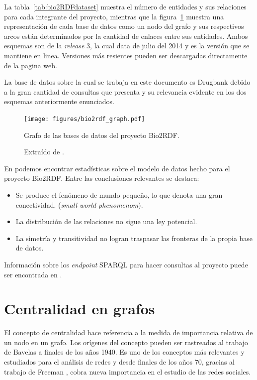 La tabla~\ref{tab:bio2RDFdataset} muestra el número de entidades y sus
relaciones para cada integrante del proyecto, mientras que la
figura~\ref{fig:bio2rdfgraph} muestra una representación de cada
base de datos como un nodo del grafo y sus respectivos arcos están determinados
por la cantidad de enlaces entre sus entidades.
Ambos esquemas son de la \emph{release} 3, la cual data de julio del 2014 y es
la versión que se mantiene en linea.
Versiones más resientes pueden ser descargadas directamente de la pagina web.

La base de datos sobre la cual se trabaja en este documento es Drugbank debido a
la gran cantidad de consultas que presenta y su relevancia evidente en los dos
esquemas anteriormente enunciados.



\begin{figure}[htpb]
  \centering
  \texttt{[image: figures/bio2rdf\_graph.pdf]}
  \caption{Grafo de las bases de datos del proyecto Bio2RDF.}
  \vspace{-.3cm}
  \caption*{Extraído de \cite{hu2015link}.}
  \label{fig:bio2rdfgraph}
\end{figure}

En \cite{hu2015link} podemos encontrar estadísticas sobre el modelo de datos
hecho para el proyecto Bio2RDF. Entre las conclusiones relevantes se destaca:
\begin{itemize}
  \item
    Se produce el fenómeno de mundo pequeño, lo que denota una gran
    conectividad. (\emph{small world phenomenom}).
  \item
    La distribución de las relaciones no sigue una ley potencial.
  \item
    La simetría y transitividad no logran traspasar las fronteras de la propia
    base de datos.
\end{itemize}

Información sobre los \emph{endpoint} SPARQL para hacer consultas al proyecto
puede ser encontrada en \cite{callahan2013bio2rdf}.


\section{Centralidad en grafos}\label{ea:cent}
El concepto de centralidad hace referencia a la medida de importancia relativa
de un nodo en un grafo.
Los orígenes del concepto pueden ser rastreados al trabajo de Bavelas a finales
de los años 1940\cite{bavelas1948mathematical}.
Es uno de los conceptos más relevantes y estudiados para el análisis de redes y
desde finales de los años 70, gracias al trabajo de Freeman 
\etal\cite{freeman1979centrality,freeman1991centrality}, 
cobra nueva importancia en el estudio de las redes sociales.

